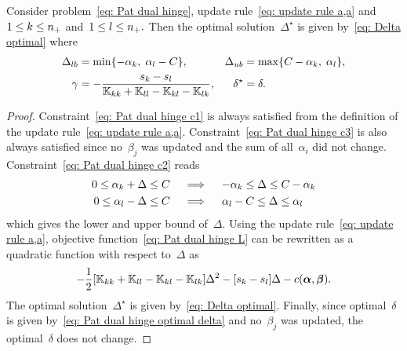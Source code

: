 \begin{lemma}
  Consider problem~\eqref{eq: Pat dual hinge}, update rule~\eqref{eq: update rule a,a} and~$1 \leq k \leq n_{+}$ and~$1 \leq l \leq n_{+}.$ Then the optimal solution~$\Delta^{\star}$ is given by~\eqref{eq: Delta optimal} where
  \begin{align*}
    \Delta_{lb} & = \min\{- \alpha_k,\; \alpha_l - C\}, &
    \Delta_{ub} & = \max\{C - \alpha_k,\; \alpha_l\}, \\
    \gamma & = -\frac{s_k - s_l}{\mathbb{K}_{kk} + \mathbb{K}_{ll} - \mathbb{K}_{kl} - \mathbb{K}_{lk}}, &
    \delta^{\star} & = \delta.
  \end{align*}
\end{lemma}

\begin{proof}
  Constraint~\eqref{eq: Pat dual hinge c1} is always satisfied from the definition of the update rule~\eqref{eq: update rule a,a}. Constraint~\eqref{eq: Pat dual hinge c3} is also always satisfied since no~$\beta_j$ was updated and the sum of all~$\alpha_i$ did not change. Constraint~\eqref{eq: Pat dual hinge c2} reads
  \begin{align*}
    0 \leq \alpha_k + \Delta \leq C
    & \quad \implies \quad
    - \alpha_k \leq \Delta \leq C - \alpha_k \\
    0 \leq \alpha_l - \Delta \leq C
    & \quad \implies \quad
    \alpha_l - C \leq \Delta \leq \alpha_l
  \end{align*}
  which gives the lower and upper bound of~$\Delta.$ Using the update rule~\eqref{eq: update rule a,a}, objective function~\eqref{eq: Pat dual hinge L} can be rewritten as a quadratic function with respect to~$\Delta$ as
  \begin{equation*}
    - \frac{1}{2} \Brac[s]{\K_{kk} + \K_{ll} - \K_{kl} - \K_{lk}} \Delta^2
    - \Brac[s]{s_k - s_l} \Delta
    - c(\bm{\alpha}, \bm{\beta}).
  \end{equation*}
  The optimal solution~$\Delta^{\star}$ is given by~\eqref{eq: Delta optimal}. Finally, since optimal~$\delta$ is given by~\eqref{eq: Pat dual hinge optimal delta} and no~$\beta_j$ was updated, the optimal~$\delta$ does not change.
\end{proof}

